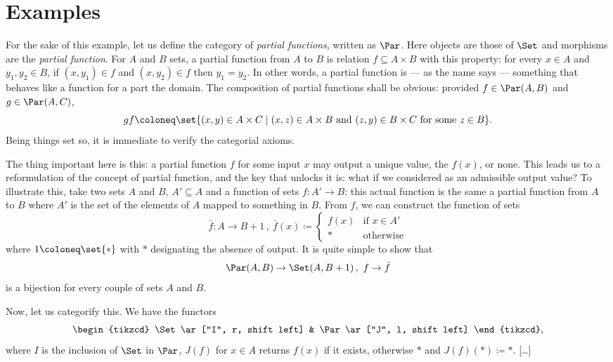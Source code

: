 
\section{Examples}

\begin{example}
For the sake of this example, let us define the category of {\em partial functions}, written as \(\Par\). Here objects are those of \(\Set\) and morphisms are the {\em partial function}. For \(A\) and \(B\) sets, a partial function from \(A\) to \(B\) is relation \(f \subseteq A \times B\) with this property: for every \(x \in A\) and \(y_1, y_2 \in B\), if \((x, y_1) \in f\) and \((x, y_2) \in f\) then \(y_1 = y_2\).
In other words, a partial function is --- as the name says --- something that behaves like a function for a part the domain. The composition of partial functions shall be obvious: provided \(f \in \Par(A, B)\) and \(g \in \Par(A, C)\),
\[gf \coloneq \set{(x, y) \in A \times C \mid (x, z) \in A \times B \text{ and } (z, y) \in B \times C \text{ for some } z \in B} .\]
Being things set so, it is immediate to verify the categorial axioms.

The thing important here is this: a partial function \(f\) for some input \(x\) may output a unique value, the \(f(x)\), or none. This leads us to a reformulation of the concept of partial function, and the key that unlocks it is: what if we considered  as an admissible output value? To illustrate this, take two sets \(A\) and \(B\), \(A' \subseteq A\) and a function of sets \(f : A' \to B\): this actual function is the same a partial function from \(A\) to \(B\) where \(A'\) is the set of the elements of \(A\) mapped to something in \(B\). From \(f\), we can construct the function of sets
\[\bar f : A \to B+1 \,, \ \bar f(x) \coloneq \begin{cases} f(x) & \text{if } x \in A' \\ \ast & \text{otherwise} \end{cases}\]
where \(1 \coloneq \set{\ast}\) with \(\ast\) designating the absence of output. It is quite simple to show that
\[\Par(A, B) \to \Set(A, B+1)\,,\ f \to \bar f\]
is a bijection for every couple of sets \(A\) and \(B\).

Now, let us categorify this. We have the functors
\[\begin{tikzcd}
\Set \ar["I", r, shift left] & \Par \ar["J", l, shift left]
\end{tikzcd},\]
where \(I\) is the inclusion of \(\Set\) in \(\Par\), \(J(f)\) for \(x \in A\) returns \(f(x)\) if it exists, otherwise \(\ast\) and \(J(f)(\ast) \coloneq \ast\). [\dots{}]
\end{example}
